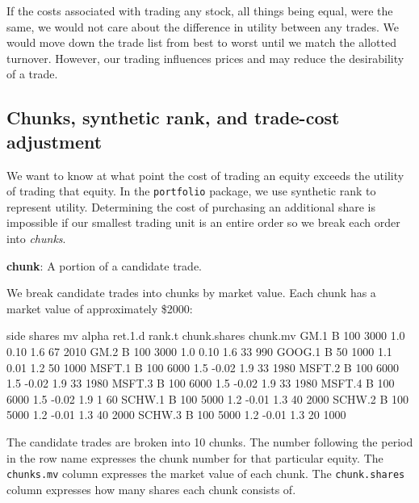 \documentclass{article}
\begin{document}
If the costs associated with trading any stock, all things being
equal, were the same, we would not care about the difference in
utility between any trades.  We would move down the trade list from
best to worst until we match the allotted turnover.  However, our
trading influences prices and may reduce the desirability of a trade.


\subsection{Chunks, synthetic rank, and trade-cost adjustment}
\label{Chunks, synthetic rank, and trade-cost adjustment}

We want to know at what point the cost of trading an equity exceeds
the utility of trading that equity.  In the \texttt{portfolio}
package, we use synthetic rank to represent utility.  Determining the
cost of purchasing an additional share is impossible if our smallest
trading unit is an entire order so we break each order into
\emph{chunks}.

\begin{description}

\item{\bf{chunk}}: A portion of a candidate trade.

\end{description}

We break candidate trades into chunks by market value.  Each chunk has
a market value of approximately \$2000:

\begin{Schunk}
\begin{Soutput}
       side shares   mv alpha ret.1.d rank.t chunk.shares chunk.mv
GM.1      B    100 3000   1.0    0.10    1.6           67     2010
GM.2      B    100 3000   1.0    0.10    1.6           33      990
GOOG.1    B     50 1000   1.1    0.01    1.2           50     1000
MSFT.1    B    100 6000   1.5   -0.02    1.9           33     1980
MSFT.2    B    100 6000   1.5   -0.02    1.9           33     1980
MSFT.3    B    100 6000   1.5   -0.02    1.9           33     1980
MSFT.4    B    100 6000   1.5   -0.02    1.9            1       60
SCHW.1    B    100 5000   1.2   -0.01    1.3           40     2000
SCHW.2    B    100 5000   1.2   -0.01    1.3           40     2000
SCHW.3    B    100 5000   1.2   -0.01    1.3           20     1000
\end{Soutput}
\end{Schunk}

The candidate trades are broken into 10 chunks.
The number following the period in the row name expresses the chunk
number for that particular equity.  The \texttt{chunks.mv} column
expresses the market value of each chunk. The \texttt{chunk.shares}
column expresses how many shares each chunk consists of.
\end{document}
